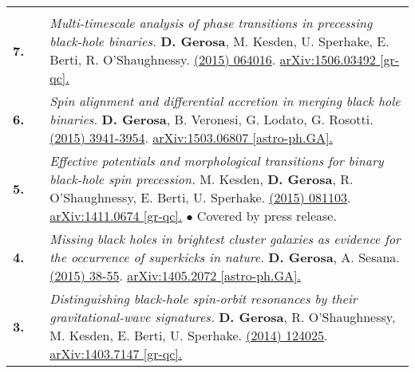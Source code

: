 {\begin{longtable}{rp{0.3cm}p{15.8cm}}
\vspace{0.09cm}\\
%
\textbf{7.} & & \textit{Multi-timescale analysis of phase transitions in precessing black-hole binaries.}
\newline{}
\textbf{D. Gerosa}, M. Kesden, U. Sperhake, E. Berti, R. O'Shaughnessy.
\newline{}
\href{http://dx.doi.org/10.1103/PhysRevD.92.064016}{\prd 92 (2015) 064016}. \href{https://arxiv.org/abs/1506.03492}{arXiv:1506.03492 [gr-qc].}
\vspace{0.09cm}\\
%
\textbf{6.} & & \textit{Spin alignment and differential accretion in merging black hole binaries.}
\newline{}
\textbf{D. Gerosa}, B. Veronesi, G. Lodato, G. Rosotti.
\newline{}
\href{http://dx.doi.org/10.1093/mnras/stv1214}{\mnras 451 (2015) 3941-3954}. \href{https://arxiv.org/abs/1503.06807}{arXiv:1503.06807 [astro-ph.GA].}
\vspace{0.09cm}\\
%
\textbf{5.} & & \textit{Effective potentials and morphological transitions for binary black-hole spin precession.}
\newline{}
M. Kesden, \textbf{D. Gerosa}, R. O'Shaughnessy, E. Berti, U. Sperhake.
\newline{}
\href{http://dx.doi.org/10.1103/PhysRevLett.114.081103}{\prl 114 (2015) 081103}. \href{https://arxiv.org/abs/1411.0674}{arXiv:1411.0674 [gr-qc].}
\newline{}
\textcolor{color1}{$\bullet$} Covered by press release.
\vspace{0.09cm}\\
%
\textbf{4.} & & \textit{Missing black holes in brightest cluster galaxies as evidence for the occurrence of superkicks in nature.}
\newline{}
\textbf{D. Gerosa}, A. Sesana.
\newline{}
\href{http://dx.doi.org/10.1093/mnras/stu2049}{\mnras 446 (2015) 38-55}. \href{https://arxiv.org/abs/1405.2072}{arXiv:1405.2072 [astro-ph.GA].}
\vspace{0.09cm}\\
%
\textbf{3.} & & \textit{Distinguishing black-hole spin-orbit resonances by their gravitational-wave signatures.}
\newline{}
\textbf{D. Gerosa}, R. O'Shaughnessy, M. Kesden, E. Berti, U. Sperhake.
\newline{}
\href{http://dx.doi.org/10.1103/PhysRevD.89.124025}{\prd 89 (2014) 124025}. \href{https://arxiv.org/abs/1403.7147}{arXiv:1403.7147 [gr-qc].}

\end{longtable}}
